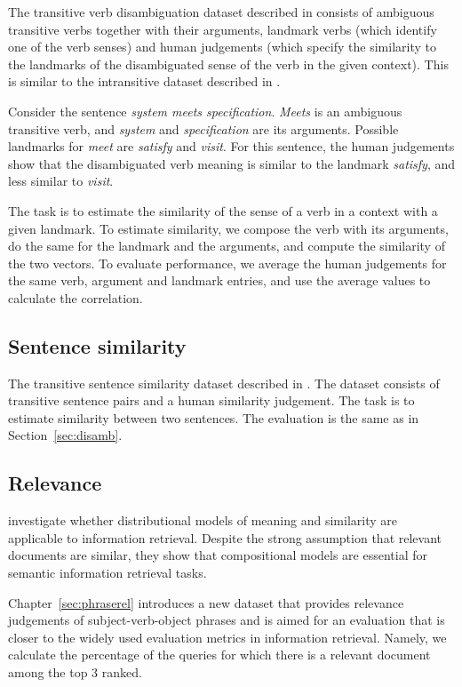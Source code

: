 The transitive verb disambiguation dataset
described in  consists of ambiguous transitive verbs together with their arguments, landmark verbs (which identify one of the verb senses) and human judgements (which specify the similarity to the landmarks of the disambiguated sense of the verb in the given context). This is similar to the intransitive dataset described in .

Consider the sentence \textit{system meets specification}. \textit{Meets} is an ambiguous transitive verb, and \textit{system}
and \textit{specification} are its arguments. Possible landmarks for \emph{meet} are \textit{satisfy} and \textit{visit}. For this sentence, the human judgements show that the disambiguated verb meaning is similar to the landmark \textit{satisfy}, and less similar to \textit{visit}.

The task is to estimate the similarity of the sense of a verb in a context with a given landmark. To estimate similarity, we compose the verb with its arguments, do the same for the landmark and the arguments, and compute the similarity of the two vectors. To evaluate performance, we average the human judgements for the same verb, argument and landmark entries, and use the average values to calculate the correlation.

\subsection{Sentence similarity}
\label{sec:sentence-similarity}

The transitive sentence similarity dataset described in . The dataset consists of transitive sentence pairs and a human similarity judgement. The task is to estimate similarity between two sentences. The evaluation is the same as in Section~\ref{sec:disamb}.

\subsection{Relevance}
\label{sec:relevance}

 investigate whether distributional models of meaning and similarity are applicable to information retrieval. Despite the strong assumption that relevant documents are similar, they show that compositional models are essential for semantic information retrieval tasks.

Chapter~\ref{sec:phraserel} introduces a new dataset that provides relevance judgements of subject-verb-object phrases and is aimed for an evaluation that is closer to the widely used evaluation metrics in information retrieval. Namely, we calculate the percentage of the queries for which there is a relevant document among the top 3 ranked.

